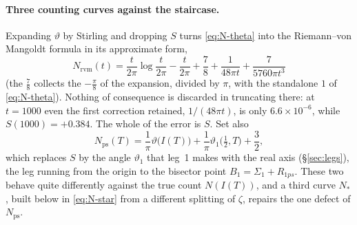 \documentclass[11pt]{article}
\theoremstyle{definition}
\begin{document}
\paragraph{Three counting curves against the staircase.} Expanding $\vartheta$ by
Stirling and dropping $S$ turns \eqref{eq:N-theta} into the Riemann--von
Mangoldt formula in its approximate form,
\begin{equation}\label{eq:N-rvm}
N_{\mathrm{rvm}}(t)
=\frac{t}{2\pi}\log\frac{t}{2\pi}-\frac{t}{2\pi}+\frac78
+\frac{1}{48\pi t}+\frac{7}{5760\pi t^{3}}
\end{equation}
(the $\tfrac78$ collects the $-\tfrac\pi8$ of the expansion, divided by $\pi$,
with the standalone $1$ of \eqref{eq:N-theta}). Nothing of consequence is
discarded in truncating there: at $t=1000$ even the first correction retained,
$1/(48\pi t)$, is only $6.6\times10^{-6}$, while $S(1000)=+0.384$. The whole of
the error is $S$. Set also
\begin{equation}\label{eq:N-ps}
N_{\mathrm{ps}}(T)
=\frac{1}{\pi}\vartheta\bigl(I(T)\bigr)
+\frac{1}{\pi}\vartheta_1\bigl(\tfrac12,T\bigr)+\frac32 ,
\end{equation}
which replaces $S$ by the angle $\vartheta_1$ that leg~1 makes with the real
axis (\S\ref{sec:legs}), the leg running from the origin to the bisector point
$B_1=\Sigma_1+R_{1ps}$. These two behave quite differently against the true
count $N(I(T))$, and a third curve $N_{\ast}$, built below in
\eqref{eq:N-star} from a different splitting of $\zeta$, repairs the one defect
of $N_{\mathrm{ps}}$.
\end{document}
